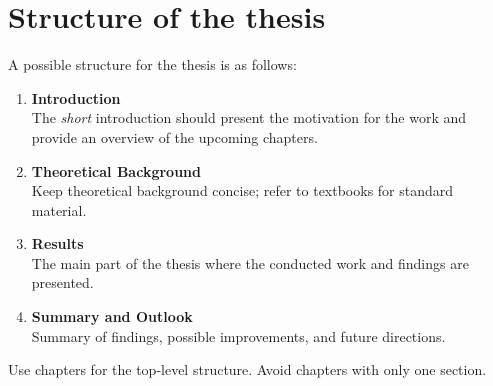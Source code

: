 \chapter{Structure of the thesis}

A possible structure for the thesis is as follows:

\begin{enumerate}
    \item \textbf{Introduction}\\
        The \emph{short} introduction should present the motivation for the work
        and provide an overview of the upcoming chapters.
    \item \textbf{Theoretical Background}\\
        Keep theoretical background concise; refer to textbooks for standard material.
    \item \textbf{Results}\\
        The main part of the thesis where the conducted work and findings are presented.
    \item \textbf{Summary and Outlook}\\
        Summary of findings, possible improvements, and future directions.
\end{enumerate}

Use chapters for the top-level structure. Avoid chapters with only one section.


